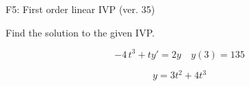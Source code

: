 \begin{exercise}
  \begin{exerciseTitle}F5: First order linear IVP (ver. 35)\end{exerciseTitle}
  \begin{exerciseStatement}
    
Find the solution to the given IVP.

    
\[-4 \, t^{3} +ty'= 2 y \hspace{1em} y( 3 ) = 135\]

  \end{exerciseStatement}
  \begin{exerciseAnswer}
    
\[y= 3 t^ 2 +4 t^{3}\]

  \end{exerciseAnswer}
\end{exercise}
